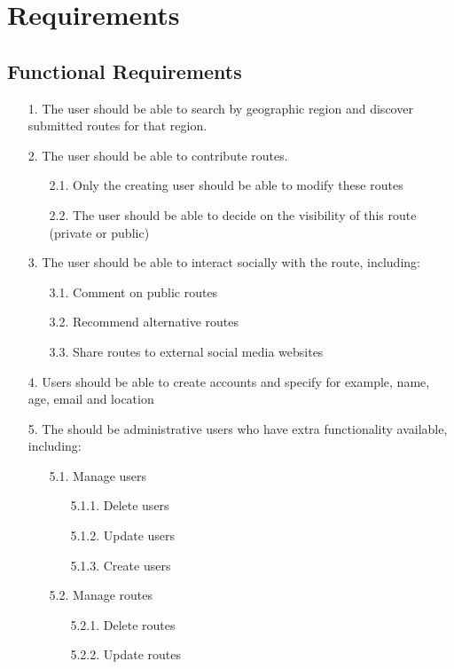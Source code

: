  \section{Requirements}
 \subsection{Functional Requirements}
 \begin{enumerate}
 \item[1.] The user should be able to search by geographic region and discover submitted routes for that region.
 \item[2.] The user should be able to contribute routes.
 	\begin{enumerate}
 	\item[2.1.] Only the creating user should be able to modify these routes
 	\item[2.2.] The user should be able to decide on the visibility of this route (private or public)
 	\end{enumerate}
 \item[3.] The user should be able to interact socially with the route, including:
 	\begin{enumerate}
 	\item[3.1.] Comment on public routes
 	\item[3.2.] Recommend alternative routes
 	\item[3.3.] Share routes to external social media websites
 	\end{enumerate}
 \item[4.] Users should be able to create accounts and specify for example, name, age, email and location 
 \item[5.] The should be administrative users who have extra functionality available, including:
	 \begin{enumerate}
 		\item[5.1.] Manage users
 		\begin{enumerate}
 			\item[5.1.1.] Delete users
 			\item[5.1.2.] Update users
 			\item[5.1.3.] Create users
 		\end{enumerate}
 		\item[5.2.] Manage routes
 		\begin{enumerate}
 			\item[5.2.1.] Delete routes
 			\item[5.2.2.] Update routes
 		\end{enumerate}

\end{enumerate}
\end{enumerate}
